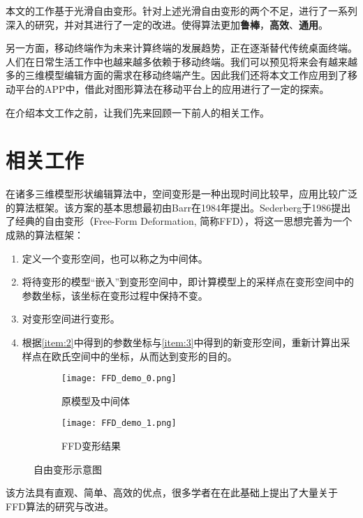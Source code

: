     本文的工作基于光滑自由变形\cite{Cui15}。针对上述光滑自由变形的两个不足，进行了一系列深入的研究，并对其进行了一定的改进。使得算法更加\textbf{鲁棒}，\textbf{高效}、\textbf{通用}。

    另一方面，移动终端作为未来计算终端的发展趋势，正在逐渐替代传统桌面终端。人们在日常生活工作中也越来越多依赖于移动终端。我们可以预见将来会有越来越多的三维模型编辑方面的需求在移动终端产生。因此我们还将本文工作应用到了移动平台的APP中，借此对图形算法在移动平台上的应用进行了一定的探索。

    在介绍本文工作之前，让我们先来回顾一下前人的相关工作。

\section{相关工作}
在诸多三维模型形状编辑算法中，空间变形是一种出现时间比较早，应用比较广泛的算法框架。该方案的基本思想最初由Barr\cite{Barr84}在1984年提出。Sederberg\cite{Sederberg86}于1986提出了经典的自由变形（Free-Form Deformation, 简称FFD），将这一思想完善为一个成熟的算法框架：
\begin{enumerate}
	\item 定义一个变形空间，也可以称之为中间体。
    \item 将待变形的模型“嵌入”到变形空间中，即计算模型上的采样点在变形空间中的参数坐标，该坐标在变形过程中保持不变。\label{item:2}
	\item 对变形空间进行变形。\label{item:3}
    \item 根据\ref{item:2}中得到的参数坐标与\ref{item:3}中得到的新变形空间，重新计算出采样点在欧氏空间中的坐标，从而达到变形的目的。
\end{enumerate}

\begin{figure}[htbp]
	\centering
	\begin{subfigure}[b]{.4\textwidth}
		\centering
		\texttt{[image: FFD\_demo\_0.png]}
		\caption{原模型及中间体}\label{subfig:FFD_demo_0}
	\end{subfigure}
	\quad
	\begin{subfigure}[b]{.4\textwidth}
		\centering
		\texttt{[image: FFD\_demo\_1.png]}
		\caption{FFD变形结果}\label{subfig:FFD_demo_1}
	\end{subfigure}
    \caption{自由变形示意图}\label{fig:FFD_demo}
\end{figure}

该方法具有直观、简单、高效的优点，很多学者在在此基础上提出了大量关于FFD算法的研究与改进。

